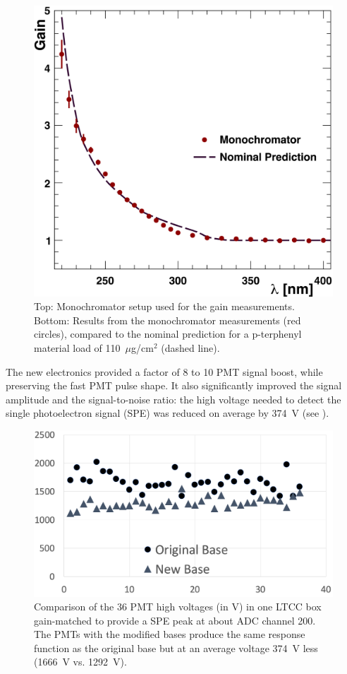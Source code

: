 \begin{figure}[H]
	\includegraphics[width=0.99\columnwidth, keepaspectratio]{img/ptQEResults.png}
	\caption{Top: Monochromator setup used for the gain measurements. Bottom: Results from the monochromator
          measurements (red circles), compared to the nominal prediction for a p-terphenyl material load of
          110~$\mu$g/cm$^2$ (dashed line).}
	\label{fig:pmtTestingSetupAndptQEResults}
\end{figure}

\noindent The new electronics provided a factor of 8 to 10 PMT signal boost, while preserving the fast PMT
pulse shape. It also significantly improved the signal amplitude and the signal-to-noise ratio: the high voltage needed
to detect the single photoelectron signal (SPE) was reduced on average by 374~V (see ).

\begin{figure}[ht]
	\centering
	\includegraphics[width=0.99\columnwidth,keepaspectratio]{img/pmtHVImprovement.png}
	\caption{Comparison of the 36 PMT high voltages (in V) in one LTCC box gain-matched to provide a SPE peak at
          about ADC channel 200. The PMTs with the modified bases produce the same response function as the original
          base but at an average voltage 374~V less (1666~V vs. 1292~V).}
	\label{fig:pmtHVImprovement}
\end{figure}

